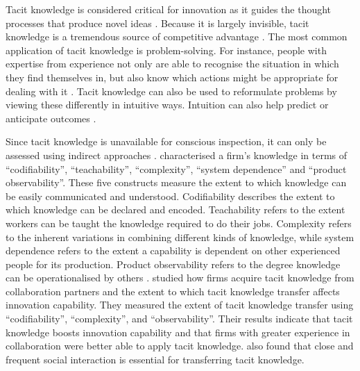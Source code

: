 Tacit knowledge is considered critical for innovation as it guides the thought processes that produce novel ideas \citep{leonard1998role,amar2008descriptive}. Because it is largely invisible, tacit knowledge is a tremendous source of competitive advantage \citep{nelson1982evolutionary,barney1991firm,grant1996toward,smith2001role,chilton2007dimensions,lu2015job}. The most common application of tacit knowledge is problem-solving. For instance, people with expertise from experience not only are able to recognise the situation in which they find themselves in, but also know which actions might be appropriate for dealing with it \citep{simon1971human,leonard1998role}. Tacit knowledge can also be used to reformulate problems by viewing these differently in intuitive ways. Intuition can also help predict or anticipate outcomes \citep{leonard1998role}.\medskip

Since tacit knowledge is unavailable for conscious inspection, it can only be assessed using indirect approaches \citep{chilton2007dimensions}. \citet{zander1995knowledge} characterised a firm's knowledge in terms of \enquote{codifiability}, \enquote{teachability}, \enquote{complexity}, \enquote{system dependence} and \enquote{product observability}. These five constructs measure the extent to which knowledge can be easily communicated and understood. Codifiability describes the extent to which knowledge can be declared and encoded. Teachability refers to the extent workers can be taught the knowledge required to do their jobs. Complexity refers to the inherent variations in combining different kinds of knowledge, while system dependence refers to the extent a capability is dependent on other experienced people for its production. Product observability refers to the degree knowledge can be operationalised by others \citep{winter1987knowledge,zander1995knowledge}. \citet{cavusgil2003tacit} studied how firms acquire tacit knowledge from collaboration partners and the extent to which tacit knowledge transfer affects innovation capability. They measured the extent of tacit knowledge transfer using \enquote{codifiability}, \enquote{complexity}, and \enquote{observability}. Their results indicate that tacit knowledge boosts innovation capability and that firms with greater experience in collaboration were better able to apply tacit knowledge. \citet{cavusgil2003tacit} also found that close and frequent social interaction is essential for transferring tacit knowledge.\medskip

